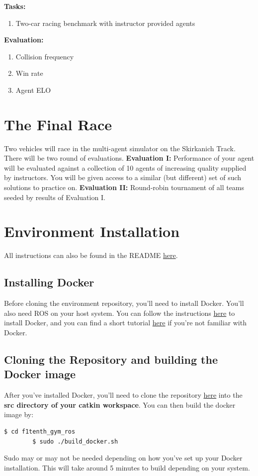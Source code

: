 \documentclass[letta4 paper]{article}
\numberwithin{equation}{section}
\newcommand{\0}{\mathbf{0}}
\begin{document}
	\textbf{Tasks: } \begin{enumerate}
		\item Two-car racing benchmark with instructor provided agents
	\end{enumerate}
	
	\noindent\textbf{Evaluation: } \begin{enumerate}
		\item Collision frequency
		\item Win rate
		\item Agent ELO
	\end{enumerate}
	
	\section{The Final Race}
	Two vehicles will race in the multi-agent simulator on the Skirkanich Track. There will be two round of evaluations. \textbf{Evaluation I: }Performance of your agent will be evaluated against a collection of 10 agents of increasing quality supplied by instructors. You will be given access to a similar (but different) set of such solutions to practice on. \textbf{Evaluation II: }Round-robin tournament of all teams seeded by results of Evaluation I.
	
	\section{Environment Installation}
	All instructions can also be found in the README \href{https://github.com/f1tenth/f1tenth_gym_ros}{here}.
	\subsection{Installing Docker}
	Before cloning the environment repository, you'll need to install Docker. You'll also need ROS on your host system. You can follow the instructions \href{https://docs.docker.com/install/linux/docker-ce/ubuntu/}{here} to install Docker, and you can find a short tutorial \href{https://docs.docker.com/get-started/}{here} if you're not familiar with Docker.
	
	\subsection{Cloning the Repository and building the Docker image}
	After you've installed Docker, you'll need to clone the repository \href{https://github.com/f1tenth/f1tenth_gym_ros}{here} into the \textbf{src directory of your catkin workspace}. You can then build the docker image by:
	\begin{lstlisting}[language=bash]
		$ cd f1tenth_gym_ros
		$ sudo ./build_docker.sh
	\end{lstlisting}
	Sudo may or may not be needed depending on how you've set up your Docker installation. This will take around 5 minutes to build depending on your system.
	
\end{document}
